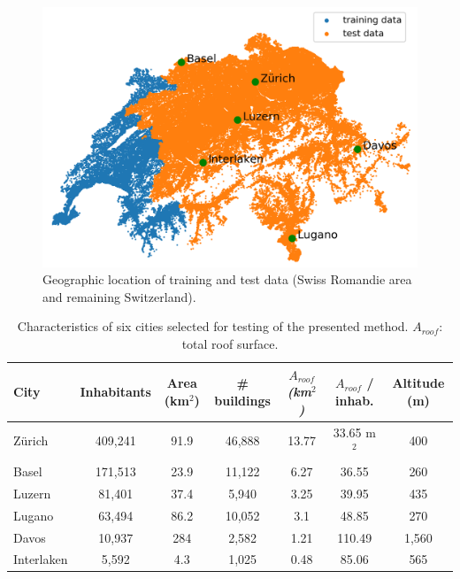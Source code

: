 \begin{figure}[tb]
\centering\includegraphics[width=0.6\linewidth]{images/Figs/train_test_w_cities.png}
\caption{Geographic location of training and test data (Swiss Romandie area and remaining Switzerland).}
\label{fig:chile_case_study}
\end{figure}

\begin{table}[thb]
\centering
\footnotesize
\caption{Characteristics of six cities selected for testing of the presented method. $A_{roof}$: total roof surface.}
\label{tab:chile_cities}
\begin{tabular}{lcccccc}
\hline
\textbf{City} & \textbf{Inhabitants} & \textbf{Area (km$^2$)} & \textbf{\# buildings} & \textit{\textbf{$A_{roof}$ (km$^2$)}} & \textbf{$A_{roof}$ / inhab.} & \textbf{Altitude (m)} \\ \hline
Zürich        & 409,241              & 91.9                & 46,888                & 13.77                         & 33.65 m$^2$                & 400                   \\
Basel         & 171,513              & 23.9                & 11,122                & 6.27                          & 36.55                   & 260                   \\
Luzern        & 81,401               & 37.4                & 5,940                 & 3.25                          & 39.95                   & 435                   \\
Lugano        & 63,494               & 86.2                & 10,052                & 3.1                           & 48.85                   & 270                   \\
Davos         & 10,937               & 284                 & 2,582                 & 1.21                          & 110.49                  & 1,560                 \\
Interlaken    & 5,592                & 4.3                 & 1,025                 & 0.48                          & 85.06                   & 565                   \\ \hline
\end{tabular}
\end{table}

